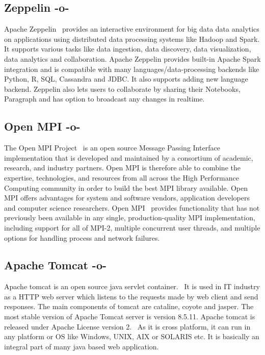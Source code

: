 \subsection{Zeppelin -o-}

Apache Zeppelin~\cite{www-zeppelinwebsite} provides an interactive
environment for big data data analytics on applications using
distributed data processing systems like Hadoop and Spark. It supports
various tasks like data ingestion, data discovery, data visualization,
data analytics and collaboration. Apache Zeppelin provides built-in
Apache Spark integration and is compatible with many
languages/data-processing backends like Python, R, SQL, Cassandra and
JDBC. It also supports adding new language backend. Zeppelin also lets
users to collaborate by sharing their Notebooks, Paragraph and has
option to broadcast any changes in realtime.

\subsection{Open MPI -o-}

The Open MPI Project~\cite{www-open-mpi} is an open source Message
Passing Interface implementation that is developed and maintained by a
consortium of academic, research, and industry partners. Open MPI is
therefore able to combine the expertise, technologies, and resources
from all across the High Performance Computing community in order to
build the best MPI library available. Open MPI offers advantages for
system and software vendors, application developers and computer
science researchers. Open MPI~\cite{open-mpi-paper-2004} provides
functionality that has not previously been available in any single,
production-quality MPI implementation, including support for all of
MPI-2, multiple concurrent user threads, and multiple options for
handling process and network failures.

\subsection{Apache Tomcat -o-}

Apache tomcat is an open source java servlet
container.~\cite{www-tomcat-official} It is used in IT industry as a
HTTP web server which listens to the requests made by web client and
send responses. The main components of tomcat are cataline, coyote and
jasper. The most stable version of Apache Tomcat server is version
8.5.11. Apache tomcat is released under Apache License version
2.~\cite{www-tomcat-wiki} As it is cross platform, it can run in any
platform or OS like Windows, UNIX, AIX or SOLARIS etc. It is basically
an integral part of many java based web application.

